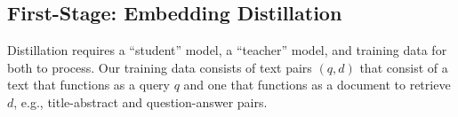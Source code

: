 \documentclass[11pt]{article}
\begin{document}



\subsection{First-Stage: Embedding Distillation}
\label{sec:embedding-training}



Distillation requires a “student” model, a “teacher” model, and training data for both to process.
Our training data consists of text pairs $(q,d)$ that consist of a text that functions as a query $q$ and one that functions as a document to retrieve $d$, e.g., title-abstract and question-answer pairs.
\end{document}
